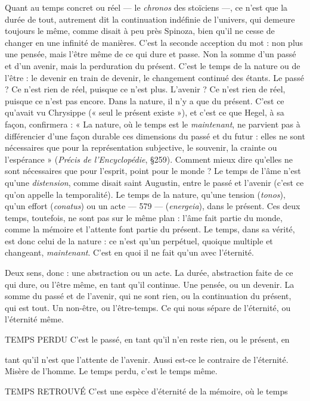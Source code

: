 Quant au temps concret ou réel — le {\it chronos} des stoïciens —, ce n’est que la
durée de tout, autrement dit la continuation indéfinie de l’univers, qui
demeure toujours le même, comme disait à peu près Spinoza, bien qu’il ne
cesse de changer en une infinité de manières. C’est la seconde acception du
mot : non plus une pensée, mais l'être même de ce qui dure et passe. Non la
somme d’un passé et d’un avenir, mais la perduration du présent. C’est le
temps de la nature ou de l’être : le devenir en train de devenir, le changement
continué des étants. Le passé ? Ce n’est rien de réel, puisque ce n’est plus.
L'avenir ? Ce n’est rien de réel, puisque ce n’est pas encore. Dans la nature, il
n’y a que du présent. C’est ce qu'avait vu Chrysippe (« seul le présent existe »),
et c’est ce que Hegel, à sa façon, confirmera : « La nature, où le temps est le
{\it maintenant}, ne parvient pas à différencier d’une façon durable ces dimensions
du passé et du futur : elles ne sont nécessaires que pour la représentation subjective,
le souvenir, la crainte ou l’espérance » ({\it Précis de l'Encyclopédie}, \S 259).
Comment mieux dire qu’elles ne sont nécessaires que pour l’esprit, point pour
le monde ? Le temps de l’âme n’est qu’une {\it distension}, comme disait saint
Augustin, entre le passé et l’avenir (c’est ce qu’on appelle la temporalité). Le
temps de la nature, qu’une tension ({\it tonos}), qu’un effort ({\it conatus}) ou un acte
— 579 —
({\it energeia}), dans le présent. Ces deux temps, toutefois, ne sont pas sur le même
plan : l’âme fait partie du monde, comme la mémoire et l'attente font partie du
présent. Le temps, dans sa vérité, est donc celui de la nature : ce n’est qu’un
perpétuel, quoique multiple et changeant, {\it maintenant}. C’est en quoi il ne fait
qu’un avec l'éternité.

Deux sens, donc : une abstraction ou un acte. La durée, abstraction faite de
ce qui dure, ou l’être même, en tant qu’il continue. Une pensée, ou un devenir.
La somme du passé et de l'avenir, qui ne sont rien, ou la continuation du présent,
qui est tout. Un non-être, ou l’être-temps. Ce qui nous sépare de l’éternité,
ou l'éternité même.

TEMPS PERDU C'est le passé, en tant qu’il n’en reste rien, ou le présent, en

tant qu’il n’est que l'attente de l’avenir. Aussi est-ce le
contraire de l'éternité. Misère de l’homme. Le temps perdu, c’est le temps
même.

TEMPS RETROUVÉ C’est une espèce d’éternité de la mémoire, où le temps

